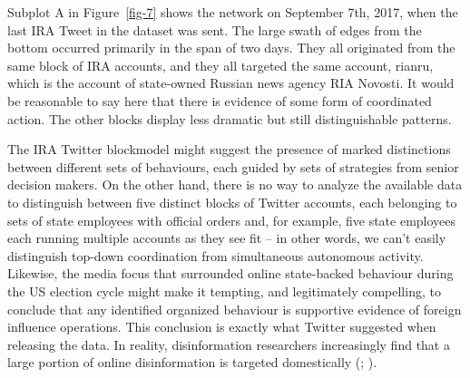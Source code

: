 \documentclass[
  12pt,
  a4paper,
  DIV=11,
  numbers=noendperiod,
  twoside,
  open=any]{scrartcl}
\begin{document}
Subplot A in Figure~\ref{fig-7} shows the network on September 7th,
2017, when the last IRA Tweet in the dataset was sent. The large swath
of edges from the bottom occurred primarily in the span of two days.
They all originated from the same block of IRA accounts, and they all
targeted the same account, rianru, which is the account of state-owned
Russian news agency RIA Novosti. It would be reasonable to say here that
there is evidence of some form of coordinated action. The other blocks
display less dramatic but still distinguishable patterns.

The IRA Twitter blockmodel might suggest the presence of marked
distinctions between different sets of behaviours, each guided by sets
of strategies from senior decision makers. On the other hand, there is
no way to analyze the available data to distinguish between five
distinct blocks of Twitter accounts, each belonging to sets of state
employees with official orders and, for example, five state employees
each running multiple accounts as they see fit -- in other words, we
can't easily distinguish top-down coordination from simultaneous
autonomous activity. Likewise, the media focus that surrounded online
state-backed behaviour during the US election cycle might make it
tempting, and legitimately compelling, to conclude that any identified
organized behaviour is supportive evidence of foreign influence
operations. This conclusion is exactly what Twitter suggested when
releasing the data. In reality, disinformation researchers increasingly
find that a large portion of online disinformation is targeted
domestically (;
).
\end{document}

